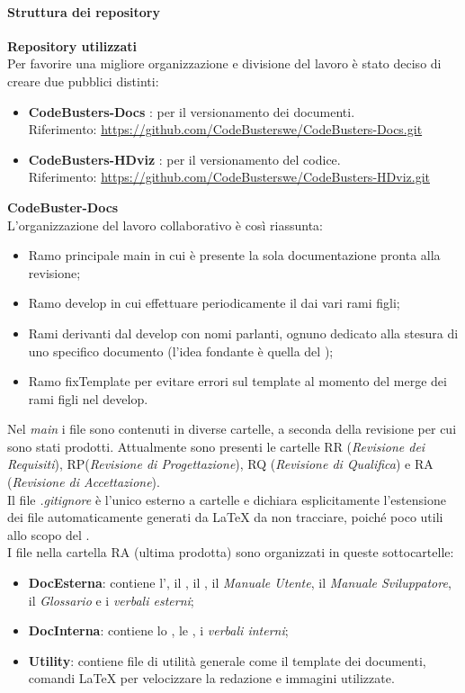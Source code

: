 \paragraph{Struttura dei repository}
\textbf{Repository utilizzati}\\
Per favorire una migliore organizzazione e divisione del lavoro è stato deciso di creare due  pubblici distinti:
\begin{itemize}
	\item \textbf{CodeBusters-Docs} : per il versionamento dei documenti. \\
	Riferimento: \textcolor{blue}{\url{https://github.com/CodeBusterswe/CodeBusters-Docs.git}}
	\item \textbf{CodeBusters-HDviz} : per il versionamento del codice. \\
	Riferimento: \textcolor{blue}{\url{https://github.com/CodeBusterswe/CodeBusters-HDviz.git}}
\end{itemize}

\mbox{}

\textbf{CodeBuster-Docs}\\
L'organizzazione del lavoro collaborativo è così riassunta:
\begin{itemize}
	\item Ramo principale main in cui è presente la sola documentazione pronta alla revisione;	
	\item Ramo develop in cui effettuare periodicamente il  dai vari rami figli;
	\item Rami derivanti dal develop con nomi parlanti, ognuno dedicato alla stesura di uno specifico documento (l'idea fondante è quella del );
	\item Ramo fixTemplate per evitare errori sul template al momento del merge dei rami figli nel develop.
\end{itemize}
Nel \textit{main} i file sono contenuti in diverse cartelle, a seconda della revisione per cui sono stati prodotti. Attualmente sono presenti le cartelle RR (\textit{Revisione dei Requisiti}), RP(\textit{Revisione di Progettazione}), RQ (\textit{Revisione di Qualifica}) e RA (\textit{Revisione di Accettazione}). \\
Il file \textit{.gitignore} è l'unico esterno a cartelle e dichiara esplicitamente l'estensione dei file automaticamente generati da \LaTeX{} da non tracciare, poiché poco utili allo scopo del . \\
I file nella cartella RA (ultima prodotta) sono organizzati in queste sottocartelle:
\begin{itemize}
	\item \textbf{DocEsterna}: contiene l'\AdR{}, il \PdP{}, il \PdQ{}, il \textit{Manuale Utente}, il \textit{Manuale Sviluppatore}, il \textit{Glossario} e i \textit{verbali esterni};
	\item \textbf{DocInterna}: contiene lo \SdF{}, le \NdP{}, i \textit{verbali interni};
	\item \textbf{Utility}: contiene file di utilità generale come il template dei documenti, comandi \LaTeX{} per velocizzare la redazione e immagini utilizzate.
\end{itemize}

